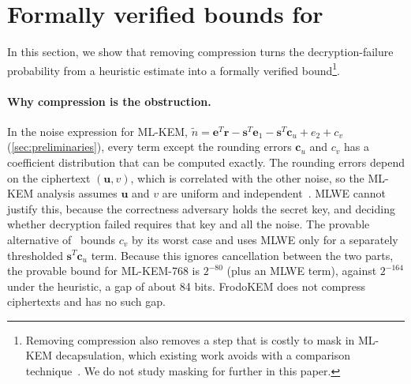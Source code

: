 \section{Formally verified bounds for \kaiburr}
\label{sec:verification}

In this section, we show that removing compression turns the decryption-failure probability from a heuristic estimate into a
formally verified bound\footnote{Removing compression also removes a step that is costly to mask in ML-KEM decapsulation, which
existing work avoids with a comparison technique~\cite{TCHES:BGRSV21}. We do not study masking for \kaiburr further in this paper.}.

\paragraph{Why compression is the obstruction.}
In the noise expression for ML-KEM,
$\tilde{n} = \mathbf{e}^T\mathbf{r} - \mathbf{s}^T\mathbf{e}_1 - \mathbf{s}^T\mathbf{c}_u + e_2 + c_v$ (\cref{sec:preliminaries}),
every term except the rounding errors $\mathbf{c}_u$ and $c_v$ has a coefficient distribution that can be computed exactly.
The rounding errors depend on the ciphertext $(\mathbf{u}, v)$, which is correlated with the other noise, so the ML-KEM
analysis assumes $\mathbf{u}$ and $v$ are uniform and independent~\cite{CCS:BKLSS25}. MLWE cannot justify this, because
the correctness adversary holds the secret key, and deciding whether decryption failed requires that key and all the noise.
The provable alternative of~\cite{CCS:BKLSS25} bounds $c_v$ by its worst case and uses MLWE only for a separately
thresholded $\mathbf{s}^T\mathbf{c}_u$ term. Because this ignores cancellation between the two parts, the provable bound
for ML-KEM-768 is $2^{-80}$ (plus an MLWE term), against $2^{-164}$ under the heuristic, a gap of about 84 bits. FrodoKEM does not compress
ciphertexts and has no such gap.

